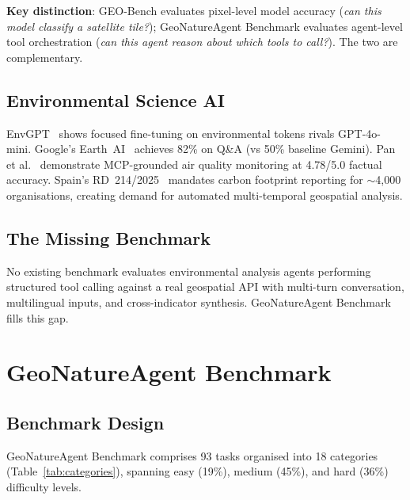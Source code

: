 \documentclass[10pt,twocolumn]{article}
\begin{document}
\textbf{Key distinction}: GEO-Bench evaluates pixel-level model accuracy (\emph{can this model classify a satellite tile?}); GeoNatureAgent Benchmark evaluates agent-level tool orchestration (\emph{can this agent reason about which tools to call?}). The two are complementary.

\subsection{Environmental Science AI}

EnvGPT~\citep{zhang2025envgpt} shows focused fine-tuning on environmental tokens rivals GPT-4o-mini. Google's Earth~AI~\citep{google2025earthai} achieves 82\% on Q\&A (vs 50\% baseline Gemini). Pan et al.~\citep{pan2025mcpairquality} demonstrate MCP-grounded air quality monitoring at 4.78/5.0 factual accuracy. Spain's RD~214/2025~\citep{spain2025rd214} mandates carbon footprint reporting for $\sim$4,000 organisations, creating demand for automated multi-temporal geospatial analysis.

\subsection{The Missing Benchmark}

No existing benchmark evaluates environmental analysis agents performing structured tool calling against a real geospatial API with multi-turn conversation, multilingual inputs, and cross-indicator synthesis. GeoNatureAgent Benchmark fills this gap.


\section{GeoNatureAgent Benchmark}
\label{sec:benchmark}

\subsection{Benchmark Design}

GeoNatureAgent Benchmark comprises 93 tasks organised into 18 categories (Table~\ref{tab:categories}), spanning easy (19\%), medium (45\%), and hard (36\%) difficulty levels.
\end{document}
